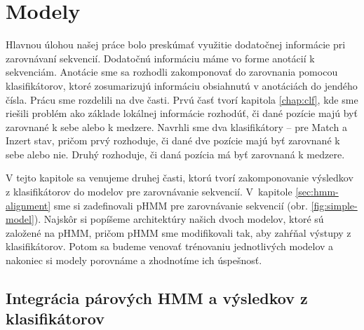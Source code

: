 \chapter{Modely}
\label{chap:models}


Hlavnou úlohou našej práce bolo preskúmať využitie dodatočnej informácie pri zarovnávaní sekvencií. Dodatočnú informáciu máme vo forme anotácií k sekvenciám. Anotácie sme sa rozhodli zakomponovať do zarovnania pomocou klasifikátorov, ktoré zosumarizujú informáciu obsiahnutú v anotáciách do jendého čísla. Prácu sme rozdelili na dve časti. Prvú časť tvorí kapitola \ref{chap:clf}, kde sme riešili problém ako základe lokálnej informácie rozhodúť, či dané pozície majú byť zarovnané k sebe alebo k medzere. Navrhli sme dva klasifikátory -- pre Match a Inzert stav, pričom prvý rozhoduje, či dané dve pozície majú byť zarovnané k sebe alebo nie. Druhý rozhoduje, či daná pozícia má byť zarovnaná k medzere.

V tejto kapitole sa venujeme druhej časti, ktorú tvorí zakomponovanie výsledkov z klasifikátorov do modelov pre zarovnávanie sekvencií. V~kapitole \ref{sec:hmm-alignment} sme si zadefinovali pHMM pre zarovnávanie sekvencií (obr. \ref{fig:simple-model}).
Najskôr si popíšeme architektúry našich dvoch modelov, ktoré sú založené na pHMM, pričom pHMM sme modifikovali tak, aby zahŕňal výstupy z klasifikátorov. Potom sa budeme venovať trénovaniu jednotlivých modelov a nakoniec si modely porovnáme a zhodnotíme ich úspešnosť.


\section[Integrácia pHMM a klasifikátorov]{Integrácia párových HMM a výsledkov z klasifikátorov}

